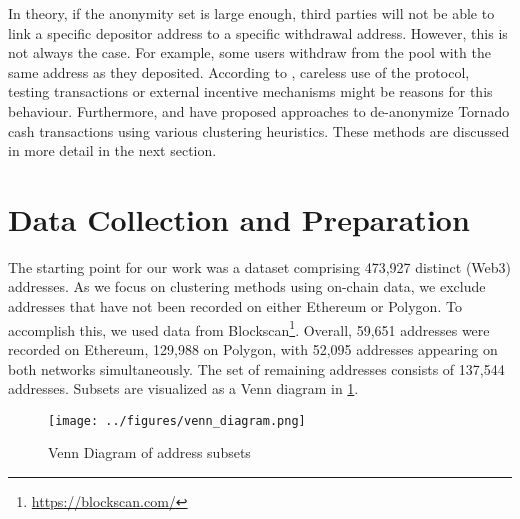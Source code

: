 \documentclass[12pt,a4paper,titlepage,oneside,english]{article}
\begin{document}
In theory, if the anonymity set is large enough, third parties will not be able to link a specific depositor address to a specific withdrawal address. However, this is not always the case. For example, some users withdraw from the pool with the same address as they deposited. According to \cite{nadler2023tornado}, careless use of the protocol, testing transactions or external incentive mechanisms might be reasons for this behaviour. \newline
Furthermore, \cite{Beres2020} and \cite{wu2022tutela} have proposed approaches to de-anonymize Tornado cash transactions using various clustering heuristics. These methods are discussed in more detail in the next section.

 


\section{Data Collection and Preparation}
The starting point for our work was a dataset comprising 473,927 distinct (Web3) addresses. %
 As we focus on clustering methods using on-chain data, we exclude addresses that have not been recorded on either Ethereum or Polygon. To accomplish this, we used data from Blockscan\footnote{\url{https://blockscan.com/}}. Overall, 59,651 addresses were recorded on Ethereum, 129,988 on Polygon, with 52,095 addresses appearing on both networks simultaneously. The set of remaining addresses consists of 137,544 addresses. Subsets are visualized as a Venn diagram in \ref{fig:Venn}.
 
\begin{figure}[h!]
	\centering
	\texttt{[image: ../figures/venn\_diagram.png]}
	\caption{Venn Diagram of address subsets}
	\label{fig:Venn}
\end{figure} 
\end{document}
